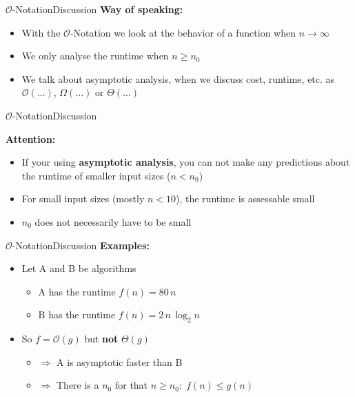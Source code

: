 \begin{frame}{$\mathcal{O}$-Notation}{Discussion}
  \textbf{Way of speaking:}
  \begin{itemize}
    \item
      With the $\mathcal{O}$-Notation we look at the behavior of a function when
      $n \to \infty$
    \item
      We only analyse the runtime when $n \geq n_0$
    \item
      We talk about {\color{Mittel-Blau}asymptotic analysis}, when we discuss 
      cost, runtime, etc. as $\mathcal{O}(\ldots)$, $\Omega(\ldots)$
      or $\Theta(\ldots)$
  \end{itemize}
\end{frame}


\begin{frame}{$\mathcal{O}$-Notation}{Discussion}
  \begin{alertblock}{\textbf{Attention:}}
    \begin{itemize}
      \item
        If your using \textbf{asymptotic analysis}, you can not make any
        predictions about the runtime of smaller input sizes ($n < n_0$)
      \item
        For small input sizes (mostly $n < 10$),
        the runtime is assessable small
      \item
        $n_0$ does not necessarily have to be small
    \end{itemize}
  \end{alertblock}
\end{frame}


\begin{frame}{$\mathcal{O}$-Notation}{Discussion}
  \textbf{Examples:}
  \begin{itemize}
    \item
    Let A and B be algorithms
    \begin{itemize}
      \item
        A has the runtime $f(n) = 80 \, n$
      \item
        B has the runtime $f(n) = 2 \, n \, \log_2 n$
    \end{itemize}
    \item
      So $f = \mathcal{O}(g)$ but \textbf{not} $\Theta(g)$
      \begin{itemize}
        \item
          $\Rightarrow$ A is asymptotic faster than B
        \item
          $\Rightarrow$
          There is a $n_0$ for that $n \geq n_0\!: \; f(n) \leq g(n)$
      \end{itemize}
  \end{itemize}
\end{frame}


